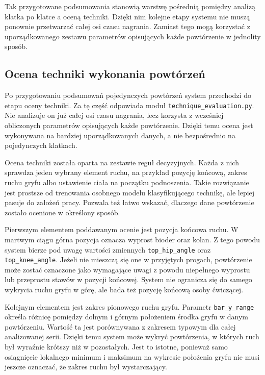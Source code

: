Tak przygotowane podsumowania stanowią warstwę pośrednią pomiędzy analizą klatka po klatce a oceną techniki. Dzięki nim kolejne etapy systemu nie muszą ponownie przetwarzać całej osi czasu nagrania. Zamiast tego mogą korzystać z uporządkowanego zestawu parametrów opisujących każde powtórzenie w jednolity sposób.

\subsection{Ocena techniki wykonania powtórzeń}

Po przygotowaniu podsumowań pojedynczych powtórzeń system przechodzi do etapu oceny techniki. Za tę część odpowiada moduł \texttt{technique\_evaluation.py}. Nie analizuje on już całej osi czasu nagrania, lecz korzysta z wcześniej obliczonych parametrów opisujących każde powtórzenie. Dzięki temu ocena jest wykonywana na bardziej uporządkowanych danych, a nie bezpośrednio na pojedynczych klatkach.

Ocena techniki została oparta na zestawie reguł decyzyjnych. Każda z nich sprawdza jeden wybrany element ruchu, na przykład pozycję końcową, zakres ruchu gryfu albo ustawienie ciała na początku podnoszenia. Takie rozwiązanie jest prostsze od trenowania osobnego modelu klasyfikującego technikę, ale lepiej pasuje do założeń pracy. Pozwala też łatwo wskazać, dlaczego dane powtórzenie zostało ocenione w określony sposób.

Pierwszym elementem poddawanym ocenie jest pozycja końcowa ruchu. W martwym ciągu górna pozycja oznacza wyprost bioder oraz kolan. Z tego powodu system bierze pod uwagę wartości zmiennych \texttt{top\_hip\_angle} oraz \texttt{top\_knee\_angle}. Jeżeli nie mieszczą się one w przyjętych progach, powtórzenie może zostać oznaczone jako wymagające uwagi z powodu niepełnego wyprostu lub przeprostu stawów w pozycji końcowej. System nie ogranicza się do samego wykrycia ruchu gryfu w górę, ale bada też pozycję końcową osoby ćwiczącej.

Kolejnym elementem jest zakres pionowego ruchu gryfu. Parametr \texttt{bar\_y\_range} określa różnicę pomiędzy dolnym i górnym położeniem środka gryfu w danym powtórzeniu. Wartość ta jest porównywana z zakresem typowym dla całej analizowanej serii. Dzięki temu system może wykryć powtórzenia, w których ruch był wyraźnie krótszy niż w pozostałych. Jest to istotne, ponieważ samo osiągnięcie lokalnego minimum i maksimum na wykresie położenia gryfu nie musi jeszcze oznaczać, że zakres ruchu był wystarczający.

